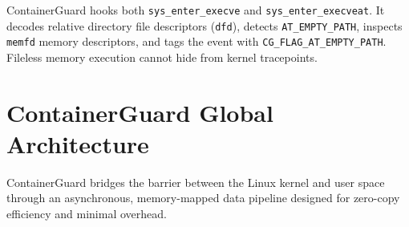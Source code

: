 \documentclass[11pt,a4paper]{article}
\begin{document}
\begin{conceptbox}
ContainerGuard hooks both \texttt{sys\_enter\_execve} and \texttt{sys\_enter\_execveat}. It decodes relative directory file descriptors (\texttt{dfd}), detects \texttt{AT\_EMPTY\_PATH}, inspects \texttt{memfd} memory descriptors, and tags the event with \texttt{CG\_FLAG\_AT\_EMPTY\_PATH}. Fileless memory execution cannot hide from kernel tracepoints.
\end{conceptbox}

\newpage


\section{ContainerGuard Global Architecture}

ContainerGuard bridges the barrier between the Linux kernel and user space through an asynchronous, memory-mapped data pipeline designed for zero-copy efficiency and minimal overhead.
\end{document}
